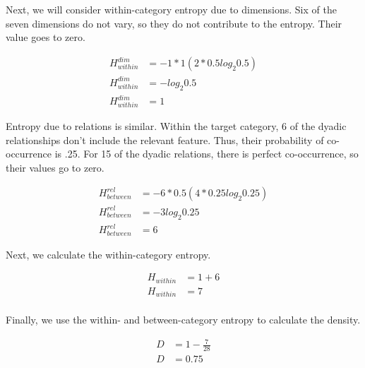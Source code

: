 \documentclass[../dissertation.tex]{subfiles}
\begin{document}
Next, we will consider within-category entropy due to dimensions. Six of the seven dimensions do not vary, so they do not contribute to the entropy. Their value goes to zero.

\begin{align*}
H^{dim}_{within} &= -1 * 1(2 * 0.5log_{2}0.5)\\
H^{dim}_{within} &= -log_{2}0.5\\
H^{dim}_{within} &= 1
\end{align*}

Entropy due to relations is similar. Within the target category, 6 of the dyadic relationships don't include the relevant feature. Thus, their probability of co-occurrence is .25. For 15 of the dyadic relations, there is perfect co-occurrence, so their values go to zero.

\begin{align*}
H^{rel}_{between} &= -6 * 0.5(4 * 0.25log_{2}0.25)\\
H^{rel}_{between} &= -3log_{2}0.25\\
H^{rel}_{between} &= 6
\end{align*}

Next, we calculate the within-category entropy.

\begin{align*}
H_{within} &= 1 + 6\\
H_{within} &= 7\\
\end{align*}

Finally, we use the within- and between-category entropy to calculate the density.

\begin{align*}
D &= 1 - \frac{7}{28}\\
D &= 0.75
\end{align*}
\end{document}
